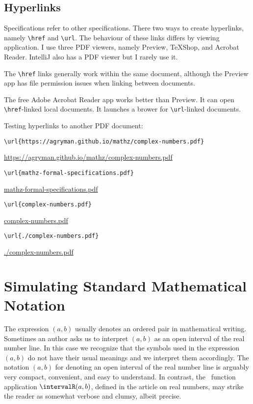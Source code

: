 \documentclass{amsart}
\begin{document}
\subsection{Hyperlinks}

Specifications refer to other specifications.
There two ways to create hyperlinks, namely \verb|\href| and \verb|\url|.
The behaviour of these links differs by viewing application.
I use three PDF viewers, namely Preview, TeXShop, and Acrobat Reader.
IntelliJ also has a PDF viewer but I rarely use it.

The \verb|\href| links generally work within the same document, although the Preview app has 
file permission issues when linking between documents.

The free Adobe Acrobat Reader app works better than Preview. 
It can open \verb|\href|-linked local documents.
It launches a brower for \verb|\url|-linked documents.

Testing hyperlinks to another PDF document:

\begin{verbatim}
\url{https://agryman.github.io/mathz/complex-numbers.pdf}
\end{verbatim}

\url{https://agryman.github.io/mathz/complex-numbers.pdf}

\begin{verbatim}
\url{mathz-formal-specifications.pdf}
\end{verbatim}

\url{mathz-formal-specifications.pdf}

\begin{verbatim}
\url{complex-numbers.pdf}
\end{verbatim}

\url{complex-numbers.pdf}

\begin{verbatim}
\url{./complex-numbers.pdf}
\end{verbatim}

\url{./complex-numbers.pdf}

\section{Simulating Standard Mathematical Notation}

The expression $(a,b)$ usually denotes an ordered pair in mathematical writing.
Sometimes an author asks us to interpret $(a,b)$ as an open interval of the real number line.
In this case we recognize that the symbols used in the expression $(a,b)$ do not have their usual meanings
and we interpret them accordingly.
The notation $(a,b)$ for denoting an open interval of the real number line is
arguably very compact, convenient, and easy to understand. 
In contrast, the \ZN\  function application $\intervalR(a,b)$, defined in the article on real numbers,
may strike the reader as somewhat verbose and clumsy, albeit precise.
\end{document}

